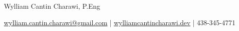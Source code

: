 \documentclass[11pt]{article}       %
\begin{document}
\centerline{\Huge Wylliam Cantin Charawi, P.Eng}

\vspace{5pt}

\centerline{\href{mailto:wylliam.cantin.charawi@gmail.com}{wylliam.cantin.charawi@gmail.com} | \href{https://wylliamcantincharawi.dev/}{wylliamcantincharawi.dev} | 438-345-4771}

\vspace{-10pt}



\end{document}

